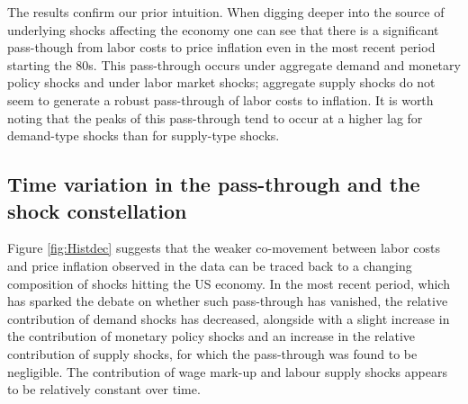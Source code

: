 \documentclass[11pt]{article}
\begin{document}
The results confirm our prior intuition. When digging deeper into the source of underlying shocks affecting the economy one can see that there is a significant pass-though from labor costs to price inflation even in the most recent period starting the 80s. This pass-through occurs under aggregate demand and monetary policy shocks and under labor market shocks; aggregate supply shocks do not seem to generate a robust pass-through of labor costs to inflation. It is worth noting that the peaks of this pass-through tend to occur at a higher lag for demand-type shocks than for supply-type shocks.


\subsection{Time variation in the pass-through and the shock constellation}

Figure \ref{fig:Histdec} suggests that the weaker co-movement between labor costs and price inflation observed in the data can be traced back to a changing composition of shocks hitting the US economy. In the most recent period, which has sparked the debate on whether such pass-through has vanished, the relative contribution of demand shocks has decreased, alongside with a slight increase in the contribution of monetary policy shocks and an increase in the relative contribution of supply shocks, for which the pass-through was found to be negligible. The contribution of wage mark-up and labour supply shocks appears to be relatively constant over time. 
\end{document}
